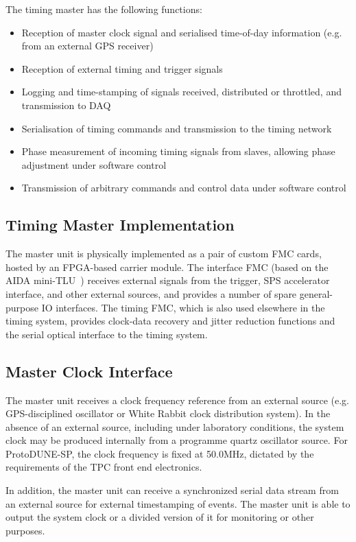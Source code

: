 \documentclass[a4paper,11pt]{article}
\begin{document}
The timing master has the following functions:

\begin{itemize}
	\item Reception of master clock signal and serialised time-of-day information (e.g. from an external GPS receiver)
	\item Reception of external timing and trigger signals
	\item Logging and time-stamping of signals received, distributed or throttled, and transmission to DAQ
	\item Serialisation of timing commands and transmission to the timing network
	\item Phase measurement of incoming timing signals from slaves, allowing phase adjustment under software control
	\item Transmission of arbitrary commands and control data under software control
\end{itemize}

\subsection{Timing Master Implementation}

The master unit is physically implemented as a pair of custom FMC cards, hosted by an FPGA-based carrier module. The interface FMC (based on the AIDA mini-TLU~\cite{TLU}) receives external signals from the trigger, SPS accelerator interface, and other external sources, and provides a number of spare general-purpose IO interfaces. The timing FMC, which is also used elsewhere in the timing system, provides clock-data recovery and jitter reduction functions and the serial optical interface to the timing system.

\subsection{Master Clock Interface}

The master unit receives a clock frequency reference from an external source (e.g. GPS-disciplined oscillator or White Rabbit clock distribution system). In the absence of an external source, including under laboratory conditions, the system clock may be produced internally from a programme quartz oscillator source. For ProtoDUNE-SP, the clock frequency is fixed at 50.0MHz, dictated by the requirements of the TPC front end electronics.

In addition, the master unit can receive a synchronized serial data stream from an external source for external timestamping of events. The master unit is able to output the system clock or a divided version of it for monitoring or other purposes.
\end{document}
